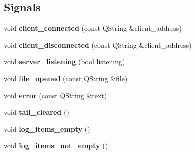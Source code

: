 \subsection*{Signals}
\begin{DoxyCompactItemize}
\item 
\hypertarget{class_log__viewer_1_1_log__manager_a66a8c749e6339ba1582a954896a264cc}{void {\bfseries client\-\_\-connected} (const Q\-String \&client\-\_\-address)}\label{class_log__viewer_1_1_log__manager_a66a8c749e6339ba1582a954896a264cc}

\item 
\hypertarget{class_log__viewer_1_1_log__manager_a341b5a25f249c3c9f5c52334b0752cd0}{void {\bfseries client\-\_\-disconnected} (const Q\-String \&client\-\_\-address)}\label{class_log__viewer_1_1_log__manager_a341b5a25f249c3c9f5c52334b0752cd0}

\item 
\hypertarget{class_log__viewer_1_1_log__manager_a43d2039d47502f27419827f1f60b6357}{void {\bfseries server\-\_\-listening} (bool listening)}\label{class_log__viewer_1_1_log__manager_a43d2039d47502f27419827f1f60b6357}

\item 
\hypertarget{class_log__viewer_1_1_log__manager_ab8995449750d2e770f4685771cf04037}{void {\bfseries file\-\_\-opened} (const Q\-String \&file)}\label{class_log__viewer_1_1_log__manager_ab8995449750d2e770f4685771cf04037}

\item 
\hypertarget{class_log__viewer_1_1_log__manager_ab7889c2b1add24d41836163ce6ca647e}{void {\bfseries error} (const Q\-String \&text)}\label{class_log__viewer_1_1_log__manager_ab7889c2b1add24d41836163ce6ca647e}

\item 
\hypertarget{class_log__viewer_1_1_log__manager_a40988e354e6cdc17e232efb579f359b3}{void {\bfseries tail\-\_\-cleared} ()}\label{class_log__viewer_1_1_log__manager_a40988e354e6cdc17e232efb579f359b3}

\item 
\hypertarget{class_log__viewer_1_1_log__manager_a053a5058cb93bcb16b39d1967dbfc832}{void {\bfseries log\-\_\-items\-\_\-empty} ()}\label{class_log__viewer_1_1_log__manager_a053a5058cb93bcb16b39d1967dbfc832}

\item 
\hypertarget{class_log__viewer_1_1_log__manager_a2aec40a074ee9eb6e78c2de0a8b157cb}{void {\bfseries log\-\_\-items\-\_\-not\-\_\-empty} ()}\label{class_log__viewer_1_1_log__manager_a2aec40a074ee9eb6e78c2de0a8b157cb}


\end{DoxyCompactItemize}
